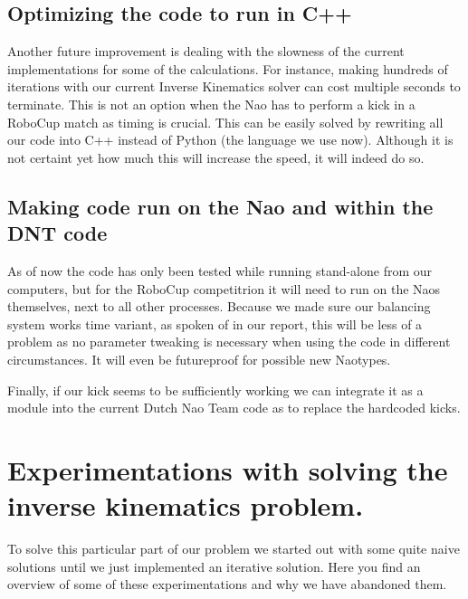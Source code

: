\documentclass[a4paper]{article}
\begin{document}
\subsection{Optimizing the code to run in C++}
Another future improvement is dealing with the slowness of the current
implementations for some of the calculations. For instance, making hundreds of 
iterations with our current Inverse Kinematics solver can cost multiple
seconds to terminate.
This is not an option when the Nao has to perform a kick in a RoboCup match
as timing is crucial. This
can be easily solved by rewriting all our code into C++ instead of Python (the
language we use now). Although it is not certaint yet how much this will
increase the speed, it will indeed do so.

\subsection{Making code run on the Nao and within the DNT code} 
As of now the code has only been tested while running stand-alone from our computers, but
for the RoboCup competitrion it will need to run on the Naos themselves, next to all
other processes. Because we
made sure our balancing system works time variant, as spoken of in our report, this
will be less of a problem as no parameter tweaking is necessary when using the
code in different circumstances. It will even be futureproof for possible new
Naotypes.

Finally, if our kick seems to be sufficiently working we can integrate it as a
module into the current Dutch Nao Team code as to replace the hardcoded kicks.

\appendix
\section{Experimentations with solving the inverse kinematics problem.}
\label{A}
To solve this particular part of our problem we started out with some quite
naive solutions until we just implemented an iterative solution.
Here you find an overview of some of these experimentations and why we have
abandoned them.
\end{document}
